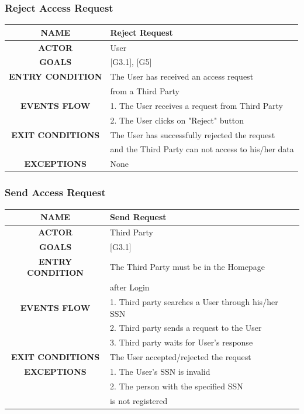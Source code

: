 \documentclass[12pt,a4paper]{article}
\begin{document}
		\newpage
		\subsubsection{Reject Access Request}
		\begin{center}
			\begin{tabular}{| c | l |}
				\hline
				\textbf{NAME} & Reject Request \\
				\hline
				\textbf{ACTOR} & User \\
				\hline
				\textbf{GOALS} & [G3.1], [G5] \\
				\hline
				\textbf{ENTRY CONDITION} & The User has received an access request\\
				& from a Third Party\\ 
				\hline
				\textbf{EVENTS FLOW}  &
				1. The User receives a request from Third Party\\
				&2. The User clicks on "Reject" button\\
				\hline
				\textbf{EXIT CONDITIONS}  & The User has successfully rejected the request\\ 
				& and the Third Party can not access to his/her data\\
				\hline
				\textbf{EXCEPTIONS} &
				None\\
				\hline
			\end{tabular}
		\end{center}
		
		\subsubsection{Send Access Request}
		\begin{center}
			\begin{tabular}{| c | l |}
				\hline
				\textbf{NAME} & Send Request \\
				\hline
				\textbf{ACTOR} & Third Party \\
				\hline
				\textbf{GOALS} & [G3.1] \\
				\hline
				\textbf{ENTRY CONDITION} & The Third Party must be in the Homepage\\ 
				& after Login\\ 
				\hline
				\textbf{EVENTS FLOW}  &
				1. Third party searches a User through his/her SSN\\
				&2. Third party sends a request to the User\\
				&3. Third party waits for User's response\\
				\hline
				\textbf{EXIT CONDITIONS}  & The User accepted/rejected the request \\ \hline
				\textbf{EXCEPTIONS} &
				1. The User's SSN is invalid\\
				&2. The person with the specified SSN\\
				&is not registered\\
				\hline
			\end{tabular}
		\end{center}
\end{document}
